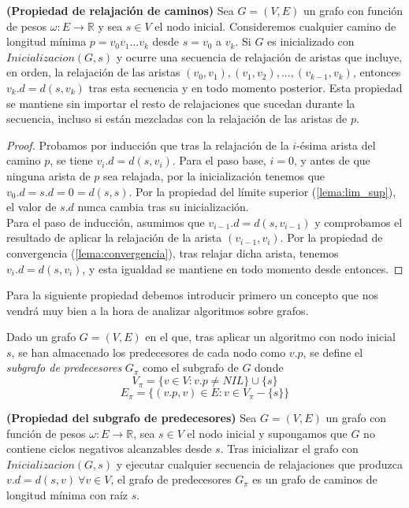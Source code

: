 \begin{lema}\label{lema:relaj_caminos}
	\textbf{(Propiedad de relajación de caminos)} Sea $G=(V,E)$ un grafo con función de pesos $\omega : E\rightarrow \mathbb{R}$ y sea $s\in V$ el nodo inicial. Consideremos cualquier camino de longitud mínima $p = v_0v_1...v_k$ desde $s=v_0$ a $v_k$. Si $G$ es inicializado con $Inicializacion(G,s)$ y ocurre una secuencia de relajación de aristas que incluye, en orden, la relajación de las aristas $(v_0,v_1),(v_1,v_2),...,(v_{k-1},v_k)$, entonces $v_k.d=d(s,v_k)$ tras esta secuencia y en todo momento posterior. Esta propiedad se mantiene sin importar el resto de relajaciones que sucedan durante la secuencia, incluso si están mezcladas con la relajación de las aristas de $p$.
\end{lema}

\begin{proof}
	Probamos por inducción que tras la relajación de la $i$-ésima arista del camino $p$, se tiene $v_i.d=d(s,v_i)$. Para el paso base, $i=0$, y antes de que ninguna arista de $p$ sea relajada, por la inicialización tenemos que $v_0.d=s.d=0=d(s,s)$. Por la propiedad del límite superior (\autoref{lema:lim_sup}), el valor de $s.d$ nunca cambia tras su inicialización. \\
	Para el paso de inducción, asumimos que $v_{i-1}.d=d(s,v_{i-1})$ y comprobamos el resultado de aplicar la relajación de la arista $(v_{i-1},v_i)$. Por la propiedad de convergencia (\autoref{lema:convergencia}), tras relajar dicha arista, tenemos $v_i.d=d(s,v_i)$, y esta igualdad se mantiene en todo momento desde entonces.
\end{proof}

Para la siguiente propiedad debemos introducir primero un concepto que nos vendrá muy bien a la hora de analizar algoritmos sobre grafos.

\begin{definicion}
	Dado un grafo $G=(V,E)$ en el que, tras aplicar un algoritmo con nodo inicial $s$, se han almacenado los predecesores de cada nodo como $v.p$, se define el \textit{subgrafo de predecesores} $G_{\pi}$ como el subgrafo de $G$ donde
	$$V_{\pi}=\{v\in V : v.p \neq NIL\}\cup \{s\}$$
	$$E_{\pi}=\{(v.p,v)\in E : v\in V_{\pi}-\{s\}\}$$
\end{definicion}

\begin{proposicion}\label{prop:subg_pred}
	\textbf{(Propiedad del subgrafo de predecesores)} Sea $G=(V,E)$ un grafo con función de pesos $\omega : E\rightarrow \mathbb{R}$, sea $s\in V$ el nodo inicial y supongamos que $G$ no contiene ciclos negativos alcanzables desde $s$. Tras inicializar el grafo con $Inicializacion(G,s)$ y ejecutar cualquier secuencia de relajaciones que produzca $v.d=d(s,v)\ \forall v\in V$, el grafo de predecesores $G_{\pi}$ es un grafo de caminos de longitud mínima con raíz $s$.
\end{proposicion}

